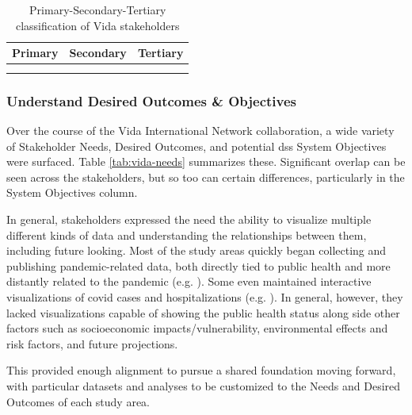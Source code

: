 \begin{table}[!htb]
\caption[Vida Stakeholders]{Primary-Secondary-Tertiary classification of Vida stakeholders}
\label{tab:vida-stakeholders}
\begin{center}
\scriptsize
\begin{tabular}{ L{4cm} L{4cm} L{4cm} } \hline

\textbf{Primary} & \textbf{Secondary} & \textbf{Tertiary}  \\ \hline

 &  &  \\
 
 &  &  \\ \hline
\end{tabular}
\end{center}
\end{table}


\subsubsection{Understand Desired Outcomes \& Objectives}

Over the course of the Vida International Network collaboration, a wide variety of Stakeholder Needs, Desired Outcomes, and potential \ac{dss} System Objectives were surfaced. Table \ref{tab:vida-needs} summarizes these. Significant overlap can be seen across the stakeholders, but so too can certain differences, particularly in the System Objectives column. 

In general, stakeholders expressed the need the ability to visualize multiple different kinds of data and understanding the relationships between them, including future looking. Most of the study areas quickly began collecting and publishing pandemic-related data, both directly tied to public health and more distantly related to the pandemic (e.g. \cite{ministeriodecienciatecnologiaconocimientoeinnovacionDatosCOVID192021}). Some even maintained interactive visualizations of \ac{covid} cases and hospitalizations (e.g. \cite{rioprefeituraPainelRioCOVID192020}). In general, however, they lacked visualizations capable of showing the public health status along side other factors such as socioeconomic impacts/vulnerability, environmental effects and risk factors, and future projections.

This provided enough alignment to pursue a shared foundation moving forward, with particular datasets and analyses to be customized to the Needs and Desired Outcomes of each study area.

